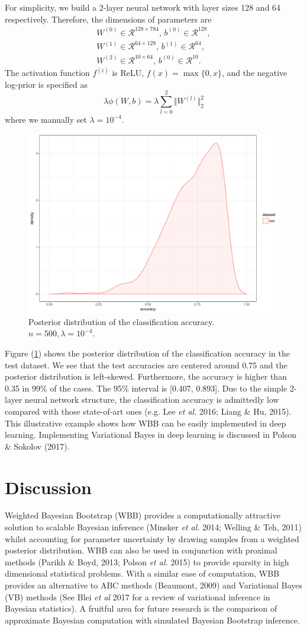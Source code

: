 \documentclass[12pt]{TD-CJS}
\newcommand{\R}{\mathcal{R}}
\begin{document}
For simplicity, we build a 2-layer neural network with layer sizes 128 and 64 respectively. Therefore, the dimensions of parameters are
\begin{align*}
W^{(0)} \in \R^{128\times 784},\, b^{(0)}\in \R^{128},\\
W^{(1)} \in \R^{64\times 128},\, b^{(1)}\in \R^{64},\\
W^{(2)} \in \R^{10\times 64},\, b^{(0)}\in \R^{10}.
\end{align*}
The activation function $f^{(i)}$ is ReLU, $f(x) = \max\{0,x\}$, and the negative log-prior is specified as 
$$
\lambda\phi(W,b) = \lambda\sum_{l=0}^{2}\Vert W^{(l)} \Vert_2^2
$$
where we manually set $\lambda = 10^{-4}$. 
\begin{figure}[!ht]
	\centering
	\includegraphics[width=0.7\linewidth]{acc}
	\caption{Posterior distribution of the classification accuracy. $n=500, \lambda=10^{-4}$.}
	\label{fig:acc}
\end{figure}
Figure (\ref{fig:acc}) shows the posterior distribution of the classification accuracy in the test dataset. We see that the test accuracies are centered around 0.75 and the posterior distribution is left-skewed. Furthermore, the accuracy is higher than 0.35 in 99\% of the cases. The 95\% interval is [0.407, 0.893].  Due to the simple 2-layer neural network structure, the classification accuracy is admittedly low compared with those state-of-art ones (e.g. Lee {\em et al.} 2016; Liang \& Hu,  2015). This illustrative example shows how WBB can be easily implemented in deep learning. Implementing Variational Bayes in deep learning is discussed in Polson \& Sokolov (2017).

\section{Discussion}
Weighted Bayesian Bootstrap (WBB) provides a computationally attractive solution to scalable Bayesian inference (Minsker {\em et al.} 2014; Welling \& Teh, 2011)
whilst accounting for parameter uncertainty by drawing  samples from a weighted posterior distribution. WBB can also be used in conjunction with proximal methods (Parikh \& Boyd, 2013; Polson {\em et al.} 
 2015)
to provide  sparsity in high dimensional statistical problems. With a similar ease of computation, WBB provides an alternative to ABC methods (Beaumont, 2009) and Variational Bayes (VB) methods (See Blei {\em et al} 2017 for a review of variational inference in Bayesian statistics). A fruitful area for future research is the comparison of approximate Bayesian computation with simulated Bayesian Bootstrap inference.
\end{document}
